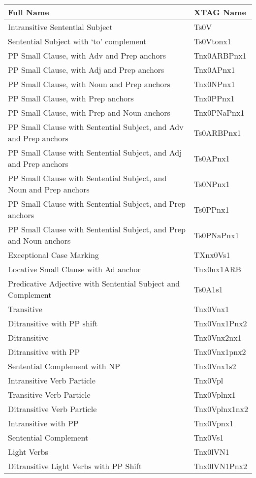 \small
\begin{tabular}{ll}
Full Name&XTAG Name\\
\hline
Intransitive Sentential Subject &  Ts0V\\
Sentential Subject with `to' complement &  Ts0Vtonx1\\
PP Small Clause, with Adv and Prep anchors & Tnx0ARBPnx1\\
PP Small Clause, with Adj and Prep anchors & Tnx0APnx1\\
PP Small Clause, with Noun and Prep anchors & Tnx0NPnx1\\
PP Small Clause, with Prep anchors & Tnx0PPnx1\\
PP Small Clause, with Prep and Noun anchors & Tnx0PNaPnx1\\
PP Small Clause with Sentential Subject, and Adv and Prep anchors & Ts0ARBPnx1\\
PP Small Clause with Sentential Subject, and Adj and Prep anchors & Ts0APnx1\\
PP Small Clause with Sentential Subject, and Noun and Prep anchors & Ts0NPnx1\\
PP Small Clause with Sentential Subject, and Prep anchors & Ts0PPnx1\\
PP Small Clause with Sentential Subject, and Prep and Noun anchors & Ts0PNaPnx1\\
Exceptional Case Marking & TXnx0Vs1\\
Locative Small Clause with Ad anchor & Tnx0nx1ARB\\
Predicative Adjective with Sentential Subject and Complement & Ts0A1s1\\
Transitive & Tnx0Vnx1\\
Ditransitive with PP shift & Tnx0Vnx1Pnx2\\
Ditransitive & Tnx0Vnx2nx1\\
Ditransitive with PP & Tnx0Vnx1pnx2\\
Sentential Complement with NP & Tnx0Vnx1s2\\
Intransitive Verb Particle & Tnx0Vpl\\
Transitive Verb Particle & Tnx0Vplnx1\\
Ditransitive Verb Particle & Tnx0Vplnx1nx2\\
Intransitive with PP & Tnx0Vpnx1\\
Sentential Complement & Tnx0Vs1\\
Light Verbs & Tnx0lVN1\\
Ditransitive Light Verbs with PP Shift & Tnx0lVN1Pnx2\\

\end{tabular}
